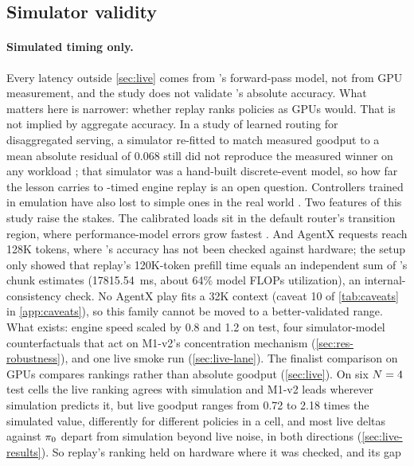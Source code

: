 \subsection{Simulator validity}
\label{sec:threats-sim}

\paragraph{Simulated timing only.}
Every latency outside \cref{sec:live} comes from \ais{}'s forward-pass model, not from GPU
measurement, and the study does not validate \ais{}'s absolute accuracy. What matters here is narrower: whether
replay ranks policies as GPUs would. That is not implied by aggregate accuracy. In a study of
learned routing for disaggregated serving, a simulator re-fitted to match measured goodput to a
mean absolute residual of 0.068 still did not reproduce the measured winner on any workload
\citep{tumkur2026calibrate}; that simulator was a hand-built discrete-event model, so how far the
lesson carries to \ais{}-timed engine replay is an open question. Controllers trained in emulation
have also lost to simple ones in the real world \citep{yan2020puffer}. Two features of this
study raise the stakes. The calibrated loads sit in the default router's transition region,
where performance-model errors grow fastest \citep{agrawal2024vidur}. And AgentX requests reach
128K tokens, where \ais{}'s accuracy has not been checked against hardware; the setup only showed
that replay's 120K-token prefill time equals an independent sum of \ais{}'s chunk estimates
(\SI{17815.54}{ms}, about 64\% model FLOPs utilization), an internal-consistency check. No AgentX
play fits a 32K context (caveat 10 of \cref{tab:caveats} in \cref{app:caveats}), so this family
cannot be moved to a better-validated range. What exists: engine speed scaled by 0.8 and 1.2 on test, four simulator-model
counterfactuals that act on M1-v2's concentration mechanism (\cref{sec:res-robustness}), and one live
smoke run (\cref{sec:live-lane}). The finalist comparison on GPUs compares rankings rather than
absolute goodput (\cref{sec:live}). On six $N = 4$ test cells the live ranking agrees with
simulation and M1-v2 leads  wherever simulation predicts it, but live goodput ranges
from 0.72 to 2.18 times the simulated value, differently for different policies in a cell, and most
live deltas against $\pi_{0}$ depart from simulation beyond live noise, in both directions
(\cref{sec:live-results}). So replay's ranking held on hardware where it was checked, and its gap
